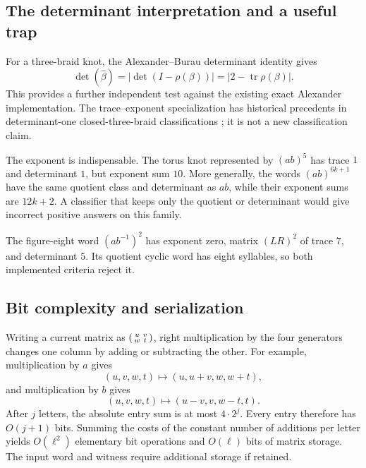 \documentclass[11pt,letterpaper]{article}
\theoremstyle{definition}
\newcommand{\tr}{\operatorname{tr}}
\begin{document}
\subsection{The determinant interpretation and a useful trap}

For a three-braid knot, the Alexander--Burau determinant identity gives
\begin{equation}
\label{eq:det}
 \det(\widehat\beta)
   =|\det(I-\rho(\beta))|
   =|2-\tr\rho(\beta)|.
\end{equation}
This provides a further independent test against the existing exact
Alexander implementation. The trace--exponent specialization has historical
precedents in determinant-one closed-three-braid classifications
\cite{birmanhilden,datta2022}; it is not a new classification claim.

The exponent is indispensable. The torus knot represented by
\((ab)^5\) has trace \(1\) and determinant \(1\), but exponent sum \(10\).
More generally, the words \((ab)^{6k+1}\) have the same quotient class
and determinant as \(ab\), while their exponent sums are \(12k+2\).
A classifier that keeps only the quotient or determinant would give
incorrect positive answers on this family.

The figure-eight word \((ab^{-1})^2\) has exponent zero, matrix
\((LR)^2\) of trace \(7\), and determinant \(5\).
Its quotient cyclic word has eight syllables, so both implemented
criteria reject it.

\subsection{Bit complexity and serialization}

Writing a current matrix as
\(\begin{psmallmatrix}u&v\\w&t\end{psmallmatrix}\), right multiplication
by the four generators changes one column by adding or subtracting the
other. For example, multiplication by \(a\) gives
\[
 (u,v,w,t)\longmapsto(u,u+v,w,w+t),
\]
and multiplication by \(b\) gives
\[
 (u,v,w,t)\longmapsto(u-v,v,w-t,t).
\]
After \(j\) letters, the absolute entry sum is at most \(4\cdot2^j\).
Every entry therefore has \(O(j+1)\) bits. Summing the costs of the
constant number of additions per letter yields \(O(\ell^2)\)
elementary bit operations and \(O(\ell)\) bits of matrix storage.
The input word and witness require additional storage if retained.
\end{document}
